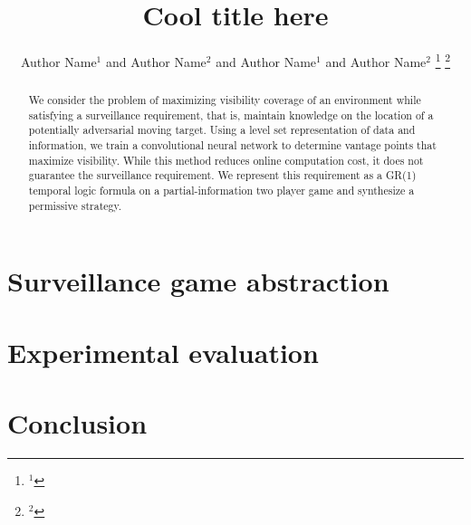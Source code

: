 \documentclass[letterpaper, 10 pt, conference]{ieeeconf}  %
\title{\LARGE \bf Cool title here}
\author{Author Name$^{1}$ and Author Name$^{2}$ and Author Name$^{1}$ and Author Name$^{2}$ %
\thanks{$^{1}$}%
\thanks{$^{2}$}%
}
\begin{document}
\maketitle
\thispagestyle{empty}
\pagestyle{empty}

\begin{abstract}

We consider the problem of maximizing visibility coverage of an environment while satisfying a surveillance requirement, that is, maintain knowledge on the location of a potentially adversarial moving target. Using a level set representation of data and information, we train a convolutional neural network to determine vantage points that maximize visibility. While this method reduces online computation cost, it does not guarantee the surveillance requirement. We represent this requirement as a GR(1) temporal logic formula on a partial-information two player game and synthesize a permissive strategy. 


\end{abstract}












\section{Surveillance game abstraction}

\section{Experimental evaluation}

\section{Conclusion}



\end{document}
